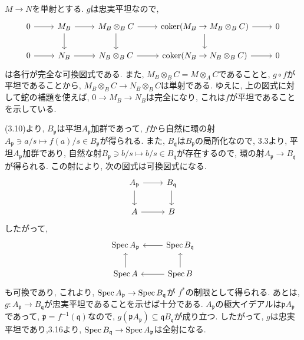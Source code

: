\documentclass[dvipdfmx]{jsarticle}
\begin{document}
    \begin{problem}
        $M \to N$を単射とする.
        $g$は忠実平坦なので,
        \[
            \begin{tikzcd}
                0 \arrow[r] & M_B  \arrow[d] \arrow[r] & M_B \otimes_B C \arrow[r]\arrow[d] & \coker(M_B \to M_B \otimes_B C) \arrow[d] \arrow[r] & 0 \\
                0 \arrow[r] &  N_B \arrow[r] & N_B \otimes_B C\arrow[r] & \coker(N_B \to N_B \otimes_B C) \arrow[r] & 0
            \end{tikzcd}
        \]
        は各行が完全な可換図式である.
        また, $M_B \otimes_B C = M \otimes_A C$であることと, $g\circ f$が平坦であることから,
        $M_B \otimes_B C \to N_B \otimes_B C$は単射である.
        ゆえに, 上の図式に対して蛇の補題を使えば, $0 \to M_B \to N_B$は完全になり,
        これは$f$が平坦であることを示している.
    \end{problem}
    \begin{problem}
        (3.10)より, $B_\mathfrak{p}$は平坦$A_\mathfrak{p}$加群であって,
        $f$から自然に環の射$A_\mathfrak{p} \ni a/s \mapsto f(a)/s \in B_\mathfrak{p}$が得られる.
        また, $B_\mathfrak{q}$は$B_\mathfrak{p}$の局所化なので, 3.3より, 平坦$A_\mathfrak{p}$加群であり,
        自然な射$B_\mathfrak{p} \ni b/s \mapsto b/s \in B_\mathfrak{q}$が存在するので,
        環の射$A_\mathfrak{p} \to B_\mathfrak{q}$が得られる.
        この射により, 次の図式は可換図式になる.
        \[
            \begin{tikzcd}
                A_\mathfrak{p} \arrow[r]\arrow[d] & B_\mathfrak{q}  \arrow[d] \\
                A \arrow[r] &  B
            \end{tikzcd}
        \]
        したがって,
        \[
            \begin{tikzcd}
                \Spec{A_\mathfrak{p}}  & \arrow[l]\Spec{B_\mathfrak{q}} \\
                \Spec{A} \arrow[u] &  \arrow[l]\Spec{B} \arrow[u]
            \end{tikzcd}
        \]
        も可換であり, これより, $\operatorname{Spec}{A_\mathfrak{p}}\to \operatorname{Spec}{B_\mathfrak{q}}$が
        $f^\ast$の制限として得られる.
        あとは, $g:A_\mathfrak{p} \to B_\mathfrak{q}$が忠実平坦であることを示せば十分である.
        $A_\mathfrak{p}$の極大イデアルは$\mathfrak{p}A_\mathfrak{p}$であって,
        $\mathfrak{p} = f^{-1}(\mathfrak{q})$なので,
        $g(\mathfrak{p}A_\mathfrak{p}) \subseteq \mathfrak{q}B_\mathfrak{q}$が成り立つ.
        したがって, $g$は忠実平坦であり,3.16より,
        $\operatorname{Spec}{B_\mathfrak{q}} \to \operatorname{Spec}{A_\mathfrak{p}}$は全射になる.
    \end{problem}
\end{document}
